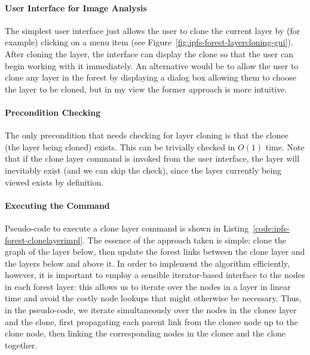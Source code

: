 \paragraph{User Interface for Image Analysis}

The simplest user interface just allows the user to clone the current layer by (for example) clicking on a menu item (see Figure~\ref{fig:ipfs-forest-layercloning-gui}). After cloning the layer, the interface can display the clone so that the user can begin working with it immediately. An alternative would be to allow the user to clone any layer in the forest by displaying a dialog box allowing them to choose the layer to be cloned, but in my view the former approach is more intuitive.


\paragraph{Precondition Checking}

The only precondition that needs checking for layer cloning is that the clonee (the layer being cloned) exists. This can be trivially checked in $O(1)$ time. Note that if the clone layer command is invoked from the user interface, the layer will inevitably exist (and we can skip the check), since the layer currently being viewed exists by definition.

\paragraph{Executing the Command}

Pseudo-code to execute a clone layer command is shown in Listing~\ref{code:ipfs-forest-clonelayerimpl}. The essence of the approach taken is simple: clone the graph of the layer below, then update the forest links between the clone layer and the layers below and above it. In order to implement the algorithm efficiently, however, it is important to employ a sensible iterator-based interface to the nodes in each forest layer: this allows us to iterate over the nodes in a layer in linear time and avoid the costly node lookups that might otherwise be necessary. Thus, in the pseudo-code, we iterate simultaneously over the nodes in the clonee layer and the clone, first propagating each parent link from the clonee node up to the clone node, then linking the corresponding nodes in the clonee and the clone together.

